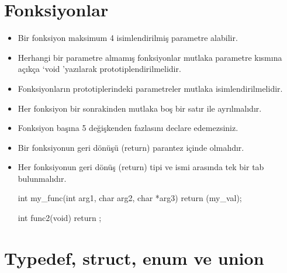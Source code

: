 \documentclass{42-en}
\begin{document}
    \section{Fonksiyonlar}

        \begin{itemize}

            \item Bir fonksiyon maksimum 4 isimlendirilmiş parametre alabilir.

            \item Herhangi bir parametre almamış fonksiyonlar mutlaka parametre kısmına açıkça ‘void ’yazılarak prototiplendirilmelidir.

            \item Fonksiyonların prototiplerindeki parametreler mutlaka isimlendirilmelidir.

            \item Her fonksiyon bir sonrakinden mutlaka boş bir satır ile ayrılmalıdır.

            \item Fonksiyon başına 5 değişkenden fazlasını declare edemezsiniz.

            \item Bir fonksiyonun geri dönüşü (return) parantez içinde olmalıdır. 

            \item Her fonksiyonun geri dönüş (return) tipi ve ismi arasında tek bir tab bulunmalıdır.

            \begin{42ccode}
int my_func(int arg1, char arg2, char *arg3)
{
    return (my_val);
}

int func2(void)
{
    return ;
}
            \end{42ccode}

        \end{itemize}
        \newpage


    \section{Typedef, struct, enum ve union}
\end{document}
